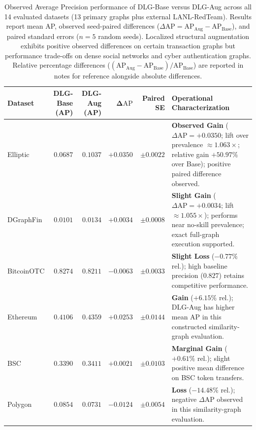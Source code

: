 \documentclass[11pt,a4paper]{article}
\begin{document}
\begin{table}[htbp]
\centering\fontsize{7.6pt}{8.9pt}\selectfont\setlength{\tabcolsep}{4pt}\renewcommand{\arraystretch}{0.92}
\renewcommand{\arraystretch}{0.92}
\caption{Observed Average Precision performance of DLG-Base versus DLG-Aug across all 14 evaluated datasets (13 primary graphs plus external LANL-RedTeam). Results report mean AP, observed seed-paired differences ($\Delta\mathrm{AP} = \mathrm{AP}_{\mathrm{Aug}} - \mathrm{AP}_{\mathrm{Base}}$), and paired standard errors ($n=5$ random seeds). Localized structural augmentation exhibits positive observed differences on certain transaction graphs but performance trade-offs on dense social networks and cyber authentication graphs. Relative percentage differences ($(\mathrm{AP}_{\mathrm{Aug}} - \mathrm{AP}_{\mathrm{Base}})/\mathrm{AP}_{\mathrm{Base}}$) are reported in notes for reference alongside absolute differences.}
\label{tab:conditional_delta}
\begin{tabularx}{\textwidth}{lrrrr>{\raggedright\arraybackslash}X}\toprule
\textbf{Dataset} & \textbf{DLG-Base (AP)} & \textbf{DLG-Aug (AP)} & $\mathbf{\Delta\mathrm{AP}}$ & \textbf{Paired SE} & \textbf{Operational Characterization} \\\midrule
Elliptic & $0.0687$ & $0.1037$ & $\mathbf{+0.0350}$ & $\pm 0.0022$ & \textbf{Observed Gain} ($\Delta\mathrm{AP} = +0.0350$; lift over prevalence $\approx 1.063\times$; relative gain $+50.97\%$ over Base); positive paired difference observed. \\
DGraphFin & $0.0101$ & $0.0134$ & $+0.0034$ & $\pm 0.0008$ & \textbf{Slight Gain} ($\Delta\mathrm{AP} = +0.0034$; lift $\approx 1.055\times$); performs near no-skill prevalence; exact full-graph execution supported. \\
BitcoinOTC & $0.8274$ & $0.8211$ & $-0.0063$ & $\pm 0.0033$ & \textbf{Slight Loss} ($-0.77\%$ rel.); high baseline precision ($0.827$) retains competitive performance. \\
Ethereum & $0.4106$ & $0.4359$ & $\mathbf{+0.0253}$ & $\pm 0.0144$ & \textbf{Gain} ($+6.15\%$ rel.); DLG-Aug has higher mean AP in this constructed similarity-graph evaluation. \\
BSC & $0.3390$ & $0.3411$ & $+0.0021$ & $\pm 0.0103$ & \textbf{Marginal Gain} ($+0.61\%$ rel.); slight positive mean difference on BSC token transfers. \\
Polygon & $0.0854$ & $0.0731$ & $-0.0124$ & $\pm 0.0054$ & \textbf{Loss} ($-14.48\%$ rel.); negative $\Delta\mathrm{AP}$ observed in this similarity-graph evaluation. \\

\end{tabularx}
\end{table}
\end{document}
